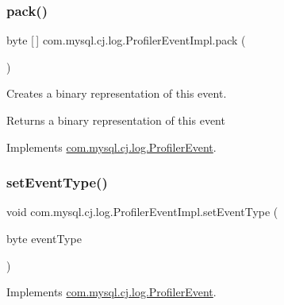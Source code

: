 \subsubsection{\texorpdfstring{pack()}{pack()}}
{\footnotesize\ttfamily byte \mbox{[}$\,$\mbox{]} com.\+mysql.\+cj.\+log.\+Profiler\+Event\+Impl.\+pack (\begin{DoxyParamCaption}{ }\end{DoxyParamCaption})}

Creates a binary representation of this event.

\begin{DoxyReturn}{Returns}
a binary representation of this event 
\end{DoxyReturn}


Implements \mbox{\hyperlink{interfacecom_1_1mysql_1_1cj_1_1log_1_1_profiler_event_ad360df515f55034065a78397e2db5269}{com.\+mysql.\+cj.\+log.\+Profiler\+Event}}.

\mbox{\label{classcom_1_1mysql_1_1cj_1_1log_1_1_profiler_event_impl_a1326d8fa5e3acbe79a145469f7316843}} 
\subsubsection{\texorpdfstring{set\+Event\+Type()}{setEventType()}}
{\footnotesize\ttfamily void com.\+mysql.\+cj.\+log.\+Profiler\+Event\+Impl.\+set\+Event\+Type (\begin{DoxyParamCaption}\item[{byte}]{event\+Type }\end{DoxyParamCaption})}



Implements \mbox{\hyperlink{interfacecom_1_1mysql_1_1cj_1_1log_1_1_profiler_event_a9d335a56c66afa440fce845f973e759e}{com.\+mysql.\+cj.\+log.\+Profiler\+Event}}.

\mbox{\label{classcom_1_1mysql_1_1cj_1_1log_1_1_profiler_event_impl_af15f923f719f69a63c271705386924b1}} 
